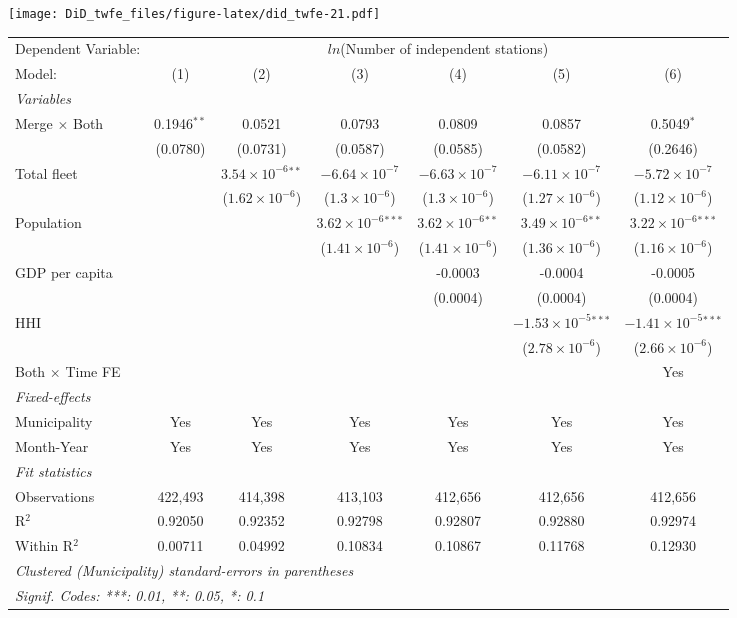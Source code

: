 \documentclass[
]{article}
\begin{document}
\texttt{[image: DiD\_twfe\_files/figure-latex/did\_twfe-21.pdf]}

\begin{tabular}{lcccccc}
\tabularnewline\midrule\midrule
Dependent Variable:&\multicolumn{6}{c}{$ln$(Number of independent stations)}\\
Model:&(1) & (2) & (3) & (4) & (5) & (6)\\
\midrule \emph{Variables}&   &   &   &   &   &  \\
Merge $\times $ Both & 0.1946$^{**}$ & 0.0521 & 0.0793 & 0.0809 & 0.0857 & 0.5049$^{*}$\\
  &(0.0780) & (0.0731) & (0.0587) & (0.0585) & (0.0582) & (0.2646)\\
Total fleet &    & $3.54\times 10^{-6}$$^{**}$ & $-6.64\times 10^{-7}$ & $-6.63\times 10^{-7}$ & $-6.11\times 10^{-7}$ & $-5.72\times 10^{-7}$\\
  &   & ($1.62\times 10^{-6}$) & ($1.3\times 10^{-6}$) & ($1.3\times 10^{-6}$) & ($1.27\times 10^{-6}$) & ($1.12\times 10^{-6}$)\\
Population &    &    & $3.62\times 10^{-6}$$^{***}$ & $3.62\times 10^{-6}$$^{**}$ & $3.49\times 10^{-6}$$^{**}$ & $3.22\times 10^{-6}$$^{***}$\\
  &   &    & ($1.41\times 10^{-6}$) & ($1.41\times 10^{-6}$) & ($1.36\times 10^{-6}$) & ($1.16\times 10^{-6}$)\\
GDP per capita &    &    &    & -0.0003 & -0.0004 & -0.0005\\
  &   &    &    & (0.0004) & (0.0004) & (0.0004)\\
HHI &    &    &    &    & $-1.53\times 10^{-5}$$^{***}$ & $-1.41\times 10^{-5}$$^{***}$\\
  &   &    &    &    & ($2.78\times 10^{-6}$) & ($2.66\times 10^{-6}$)\\
Both $\times$ Time FE &  &  &  &  &  & Yes\\
\midrule \emph{Fixed-effects}&   &   &   &   &   &  \\
Municipality & Yes & Yes & Yes & Yes & Yes & Yes\\
Month-Year & Yes & Yes & Yes & Yes & Yes & Yes\\
\midrule \emph{Fit statistics}&  & & & & & \\
Observations & 422,493&414,398&413,103&412,656&412,656&412,656\\
R$^2$ & 0.92050&0.92352&0.92798&0.92807&0.92880&0.92974\\
Within R$^2$ & 0.00711&0.04992&0.10834&0.10867&0.11768&0.12930\\
\midrule\midrule\multicolumn{7}{l}{\emph{Clustered (Municipality) standard-errors in parentheses}}\\
\multicolumn{7}{l}{\emph{Signif. Codes: ***: 0.01, **: 0.05, *: 0.1}}\\
\end{tabular}
\end{document}

